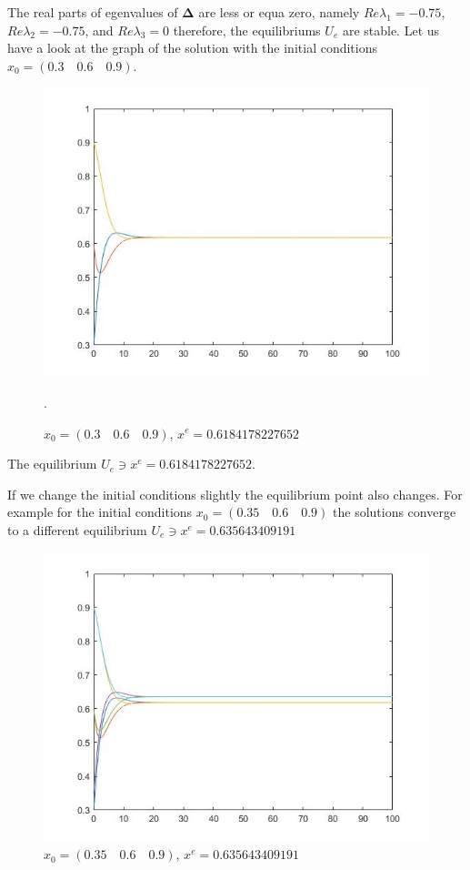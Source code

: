 \documentclass[a4paper,10pt, english]{article}
\begin{document}
The real parts of egenvalues of $\mathbf{\Delta}$ are less or equa zero, namely $Re\lambda_1 = -0.75$,  $Re\lambda_2 = -0.75$, and $Re\lambda_3 = 0$ therefore, the equilibriums 
$U_e$ are stable.
Let us have a look at the graph of the solution with the initial conditions $x_0 = (0.3\quad 0.6\quad 0.9)$.

\begin{figure}[ht]
\label{fig_c1}
\centering
\includegraphics[scale=0.4]{1.jpg}
\caption{$x_0 = (0.3 \quad0.6\quad 0.9)$, $x^e = 0.6184178227652$}.
\end{figure}

The equilibrium  $U_e\ni x^e = 0.6184178227652$.




\newpage
If we change the initial conditions slightly the equilibrium point also changes. For example for the initial conditions
$x_0 = (0.35\quad 0.6\quad 0.9)$ the solutions converge to a different  equilibrium $U_e\ni x^e = 0.635643409191$
\begin{figure}[ht]
\label{fig_c2}
\centering
\includegraphics[scale= 0.4]{2.jpg}

\caption{$x_0 = (0.35 \quad0.6\quad 0.9)$, $x^e = 0.635643409191$}
\end{figure}
\end{document}
